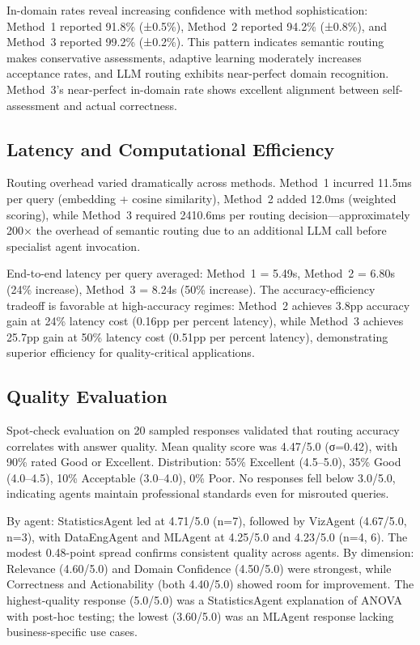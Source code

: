 \documentclass[11pt]{article}
\begin{document}
In-domain rates reveal increasing confidence with method sophistication: Method~1 reported 91.8\% (±0.5\%), Method~2 reported 94.2\% (±0.8\%), and Method~3 reported 99.2\% (±0.2\%). This pattern indicates semantic routing makes conservative assessments, adaptive learning moderately increases acceptance rates, and LLM routing exhibits near-perfect domain recognition. Method~3's near-perfect in-domain rate shows excellent alignment between self-assessment and actual correctness.

\subsection{Latency and Computational Efficiency}

Routing overhead varied dramatically across methods. Method~1 incurred 11.5ms per query (embedding + cosine similarity), Method~2 added 12.0ms (weighted scoring), while Method~3 required 2410.6ms per routing decision—approximately 200× the overhead of semantic routing due to an additional LLM call before specialist agent invocation.

End-to-end latency per query averaged: Method~1 = 5.49s, Method~2 = 6.80s (24\% increase), Method~3 = 8.24s (50\% increase). The accuracy-efficiency tradeoff is favorable at high-accuracy regimes: Method~2 achieves 3.8pp accuracy gain at 24\% latency cost (0.16pp per percent latency), while Method~3 achieves 25.7pp gain at 50\% latency cost (0.51pp per percent latency), demonstrating superior efficiency for quality-critical applications.

\subsection{Quality Evaluation}

Spot-check evaluation on 20 sampled responses validated that routing accuracy correlates with answer quality. Mean quality score was 4.47/5.0 (σ=0.42), with 90\% rated Good or Excellent. Distribution: 55\% Excellent (4.5--5.0), 35\% Good (4.0--4.5), 10\% Acceptable (3.0--4.0), 0\% Poor. No responses fell below 3.0/5.0, indicating agents maintain professional standards even for misrouted queries.

By agent: StatisticsAgent led at 4.71/5.0 (n=7), followed by VizAgent (4.67/5.0, n=3), with DataEngAgent and MLAgent at 4.25/5.0 and 4.23/5.0 (n=4, 6). The modest 0.48-point spread confirms consistent quality across agents. By dimension: Relevance (4.60/5.0) and Domain Confidence (4.50/5.0) were strongest, while Correctness and Actionability (both 4.40/5.0) showed room for improvement. The highest-quality response (5.0/5.0) was a StatisticsAgent explanation of ANOVA with post-hoc testing; the lowest (3.60/5.0) was an MLAgent response lacking business-specific use cases.
\end{document}
